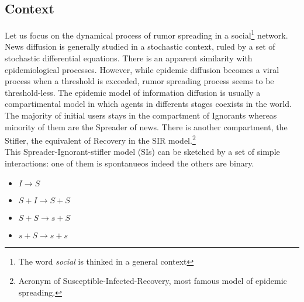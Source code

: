 \subsection{Context}
Let us focus on the dynamical process of rumor spreading in a social\footnote{The word \textit{ social} is thinked in a general context} network.
 News diffusion is generally studied in a stochastic context, ruled by a set of stochastic differential equations.
 There is an apparent similarity with  epidemiological processes. 
However, while epidemic diffusion becomes a viral process when a threshold is exceeded, rumor spreading process seems to be threshold-less.
 The epidemic model of information diffusion is usually a compartimental model in which agents in differents stages coexists in the world.
The majority of initial users stays in the compartment of Ignorants whereas minority of them are the Spreader of news.
 There is another compartment, the Stifler, the equivalent of Recovery in the SIR model.\footnote{Acronym of Susceptible-Infected-Recovery, most famous model of epidemic spreading.}
\\ This Spreader-Ignorant-stifler model (SIs) can be sketched by a set of simple interactions: one of them is spontanueos indeed the others are binary.
\begin{itemize}
\item$ I \longrightarrow S$
\item $S+I \longrightarrow S + S$

\item $S + S \longrightarrow s + S$

\item $s + S \longrightarrow  s + s$
\end{itemize}

